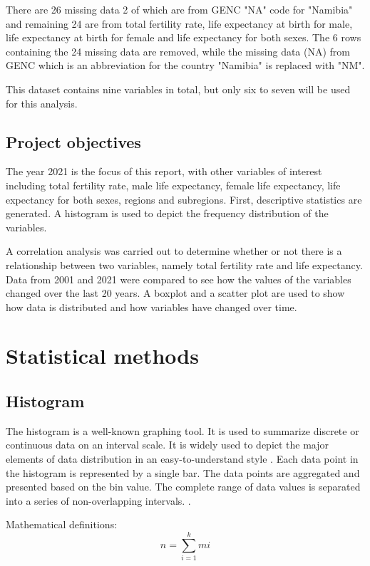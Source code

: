 \documentclass[12 pt]{scrartcl}
\begin{document}
There are 26 missing data 2 of which are from GENC "NA" code for "Namibia"  and remaining 24 are from total fertility rate, life expectancy at birth for male, life expectancy at birth for female and life expectancy for both sexes. The 6 rows containing the 24 missing data are removed, while the missing data (NA) from GENC which is an abbreviation for the country "Namibia" is replaced with "NM". 

This dataset contains nine variables in total, but only six to seven will be used for this analysis.


\subsection{Project objectives}

The year 2021 is the focus of this report, with other variables of interest including total fertility rate, male life expectancy, female life expectancy, life expectancy for both sexes, regions and subregions. First, descriptive statistics are generated. A histogram is used to depict the frequency distribution of the variables. 

A correlation analysis was carried out to determine whether or not there is a relationship between two variables, namely total fertility rate and life expectancy. Data from 2001 and 2021 were compared to see how the values of the variables changed over the last 20 years. A boxplot and a scatter plot are used to show how data is distributed and how variables have changed over time.


\section{Statistical methods}
\subsection{Histogram}

The histogram is a well-known graphing tool. It is used to summarize discrete or continuous data on an interval scale. It is widely used to depict the major elements of data distribution in an easy-to-understand style \citep{Stat_Methods}. Each data point in the histogram is represented by a single bar. The data points are aggregated and presented based on the bin value. The complete range of data values is separated into a series of non-overlapping intervals. \citep{Stat_Methods}. 

Mathematical definitions:
\[n = \sum_{i=1}^{k}{mi} \]
\end{document}
